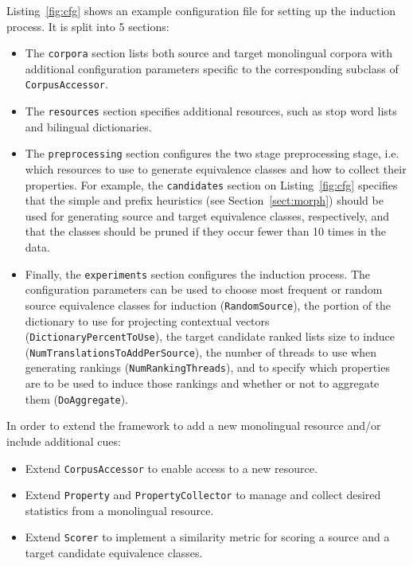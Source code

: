 \documentclass{article}
\newcommand{\secref}[1]{Section~\ref{#1}}
\newcommand{\lstref}[1]{Listing~\ref{#1}}
\newcommand{\code}[1]{{\small \tt #1}}
\begin{document}
\lstref{fig:cfg} shows an example configuration file for setting up the induction process.  It is split into 5 sections:

\begin{itemize}
  \item The \code{corpora} section lists both source and target monolingual corpora with additional configuration parameters specific to the corresponding subclass of \code{CorpusAccessor}.
  \item The \code{resources} section specifies additional resources, such as stop word lists and bilingual dictionaries.
  \item The \code{preprocessing} section configures the two stage preprocessing stage, i.e. which resources to use to generate equivalence classes and how to collect their properties.  For example, the \code{candidates} section on \lstref{fig:cfg} specifies that the simple and prefix heuristics (see \secref{sect:morph}) should be used for generating source and target equivalence classes, respectively, and that the classes should be pruned if they occur fewer than 10 times in the data.
  \item Finally, the \code{experiments} section configures the induction process.  The configuration parameters can be used to choose most frequent or random source equivalence classes for induction (\code{RandomSource}), the portion of the dictionary to use for projecting contextual vectors (\code{DictionaryPercentToUse}), the target candidate ranked lists size to induce  (\code{NumTranslationsToAddPerSource}), the number of threads to use when generating rankings (\code{NumRankingThreads}), and to specify which properties are to be used to induce those rankings and whether or not to aggregate them (\code{DoAggregate}).\\
\end{itemize}

In order to extend the framework to add a new monolingual resource and/or include additional cues:

\begin{itemize}
  \item Extend \code{CorpusAccessor} to enable access to a new resource.
  \item Extend \code{Property} and \code{PropertyCollector} to manage and collect desired statistics from a monolingual resource.
  \item Extend \code{Scorer} to implement a similarity metric for scoring a source and a target candidate equivalence classes.
\end{itemize}
\end{document}
